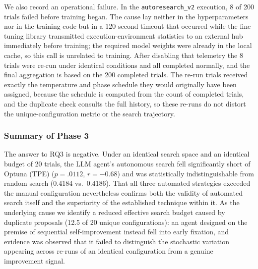 We also record an operational failure. In the \texttt{autoresearch\_v2} execution,
8 of 200 trials failed before training began. The cause lay neither in the
hyperparameters nor in the training code but in a 120-second timeout that
occurred while the fine-tuning library transmitted execution-environment
statistics to an external hub immediately before training; the required model
weights were already in the local cache, so this call is unrelated to training.
After disabling that telemetry the 8 trials were re-run under identical
conditions and all completed normally, and the final aggregation is based on the
200 completed trials. The re-run trials received exactly the temperature and
phase schedule they would originally have been assigned, because the schedule is
computed from the count of completed trials, and the duplicate check consults the
full history, so these re-runs do not distort the unique-configuration metric or
the search trajectory.

\subsubsection{Summary of Phase 3}

The answer to RQ3 is negative. Under an identical search space and an identical
budget of 20 trials, the LLM agent's autonomous search fell significantly short of
Optuna (TPE) ($p = .0112$, $r = -0.68$) and was statistically indistinguishable
from random search (0.4184 vs.\ 0.4186). That all three automated strategies
exceeded the manual configuration nevertheless confirms both the validity of
automated search itself and the superiority of the established technique within
it. As the underlying cause we identify a reduced effective search budget caused
by duplicate proposals (12.5 of 20 unique configurations): an agent designed on
the premise of sequential self-improvement instead fell into early fixation, and
evidence was observed that it failed to distinguish the stochastic variation
appearing across re-runs of an identical configuration from a genuine improvement
signal.

